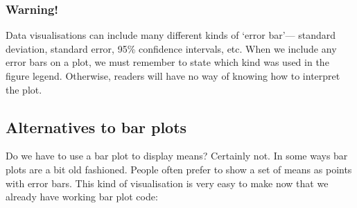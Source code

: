 \documentclass[
]{book}
\newenvironment{greybox}{
  \definecolor{shadecolor}{rgb}{0.95,0.95,0.95}  %
  \color{black}
  \begin{shaded}}
 {\end{shaded}}
\newenvironment{infobox}[1]
  {
  \begin{itemize}
  \renewcommand{\labelitemi}{
    \raisebox{-.7\height}[0pt][0pt]{
      {\setkeys{Gin}{width=3em,keepaspectratio}
        \texttt{[image: images/\#1]}}
    }
  }
  \setlength{\fboxsep}{1em}
  \begin{greybox}
  \item
  }
  {
  \end{greybox}
  \end{itemize}
  }
\begin{document}
\begin{infobox}{warning}

\hypertarget{warning-1}{%
\subsubsection*{Warning!}\label{warning-1}}

Data visualisations can include many different kinds of `error bar'--- standard deviation, standard error, 95\% confidence intervals, etc. When we include any error bars on a plot, we must remember to state which kind was used in the figure legend. Otherwise, readers will have no way of knowing how to interpret the plot.

\end{infobox}

\hypertarget{alternatives-to-bar-plots}{%
\subsection{Alternatives to bar plots}\label{alternatives-to-bar-plots}}

Do we have to use a bar plot to display means? Certainly not. In some ways bar plots are a bit old fashioned. People often prefer to show a set of means as points with error bars. This kind of visualisation is very easy to make now that we already have working bar plot code:
\end{document}
